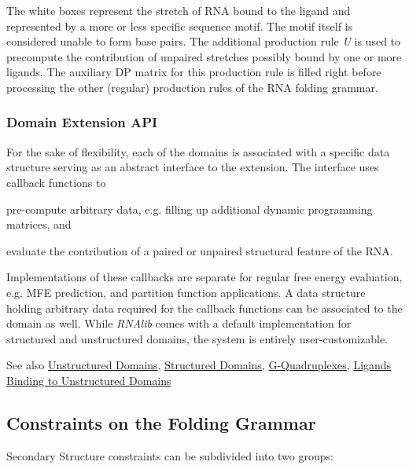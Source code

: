 The white boxes represent the stretch of R\+NA bound to the ligand and represented by a more or less specific sequence motif. The motif itself is considered unable to form base pairs. The additional production rule {\itshape U} is used to precompute the contribution of unpaired stretches possibly bound by one or more ligands. The auxiliary DP matrix for this production rule is filled right before processing the other (regular) production rules of the R\+NA folding grammar.\hypertarget{folding_grammar_sec_domains_api}{}\subsubsection{Domain Extension A\+PI}\label{folding_grammar_sec_domains_api}
For the sake of flexibility, each of the domains is associated with a specific data structure serving as an abstract interface to the extension. The interface uses callback functions to


\begin{DoxyItemize}
\item pre-\/compute arbitrary data, e.\+g. filling up additional dynamic programming matrices, and
\item evaluate the contribution of a paired or unpaired structural feature of the R\+NA.
\end{DoxyItemize}

Implementations of these callbacks are separate for regular free energy evaluation, e.\+g. M\+FE prediction, and partition function applications. A data structure holding arbitrary data required for the callback functions can be associated to the domain as well. While {\itshape R\+N\+Alib} comes with a default implementation for structured and unstructured domains, the system is entirely user-\/customizable.

\begin{DoxySeeAlso}{See also}
\hyperlink{group__domains__up}{Unstructured Domains}, \hyperlink{group__domains__struc}{Structured Domains}, \hyperlink{group__gquads}{G-\/\+Quadruplexes}, \hyperlink{group__ligands__up}{Ligands Binding to Unstructured Domains}
\end{DoxySeeAlso}
\hypertarget{folding_grammar_sec_constraints}{}\subsection{Constraints on the Folding Grammar}\label{folding_grammar_sec_constraints}
Secondary Structure constraints can be subdivided into two groups\+:



